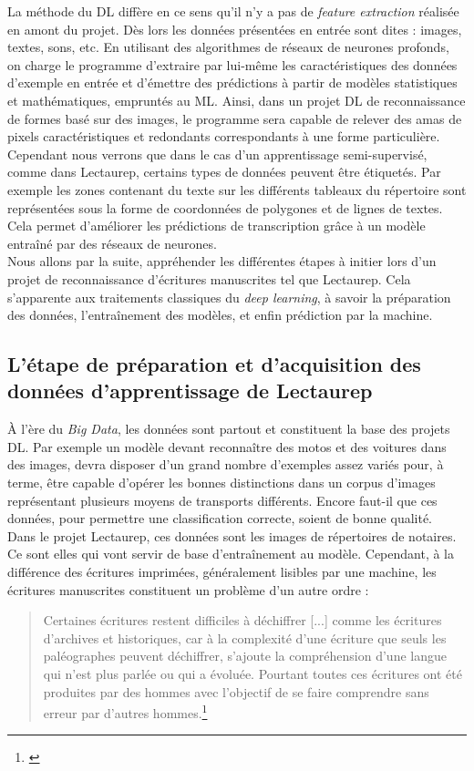 La méthode du DL diffère en ce sens qu'il n'y a pas de \textit{feature extraction} réalisée en amont du projet. Dès lors les données présentées en entrée sont dites  : images, textes, sons, etc. En utilisant des algorithmes de réseaux de neurones profonds, on charge le programme d'extraire par lui-même les caractéristiques des données d'exemple en entrée et d'émettre des prédictions à partir de modèles statistiques et mathématiques, empruntés au ML. Ainsi, dans un projet DL de reconnaissance de formes basé sur des images, le programme sera capable de relever des amas de pixels caractéristiques et redondants correspondants à une forme particulière. Cependant nous verrons que dans le cas d'un apprentissage semi-supervisé, comme dans Lectaurep, certains types de données peuvent être étiquetés. Par exemple les zones contenant du texte sur les différents tableaux du répertoire sont représentées sous la forme de coordonnées de polygones et de lignes de textes. Cela permet d'améliorer les prédictions de transcription grâce à un modèle entraîné par des réseaux de neurones.\\ 

Nous allons par la suite, appréhender les différentes étapes à initier lors d'un projet de reconnaissance d'écritures manuscrites tel que Lectaurep. Cela s'apparente aux traitements classiques du \textit{deep learning}, à savoir la préparation des données, l'entraînement des modèles, et enfin prédiction par la machine.

\subsection{L'étape de préparation et d'acquisition des données d'apprentissage de Lectaurep}

À l'ère du \textit{Big Data}, les données sont partout et constituent la base des projets DL. Par exemple un modèle devant reconnaître des motos et des voitures dans des images, devra disposer d'un grand nombre d'exemples assez variés pour, à terme, être capable d'opérer les bonnes distinctions dans un corpus d'images représentant plusieurs moyens de transports différents. Encore faut-il que ces données, pour permettre une classification correcte, soient de bonne qualité.\\

Dans le projet Lectaurep, ces données sont les images de répertoires de notaires. Ce sont elles qui vont servir de base d'entraînement au modèle. Cependant, à la différence des écritures imprimées, généralement lisibles par une machine, les écritures manuscrites constituent un problème d'un autre ordre : \newpage
\begin{quote}
    Certaines écritures restent difficiles à déchiffrer [...] comme les écritures d'archives et historiques, car à la complexité d'une écriture que seuls les paléographes peuvent déchiffrer, s'ajoute la compréhension d'une langue qui n'est plus parlée ou qui a évoluée. Pourtant toutes ces écritures ont été produites par des hommes avec l'objectif de se faire comprendre sans erreur par d'autres hommes.\footnote{\cite{kermorvant_reconnaissance_2019}}
\end{quote}

